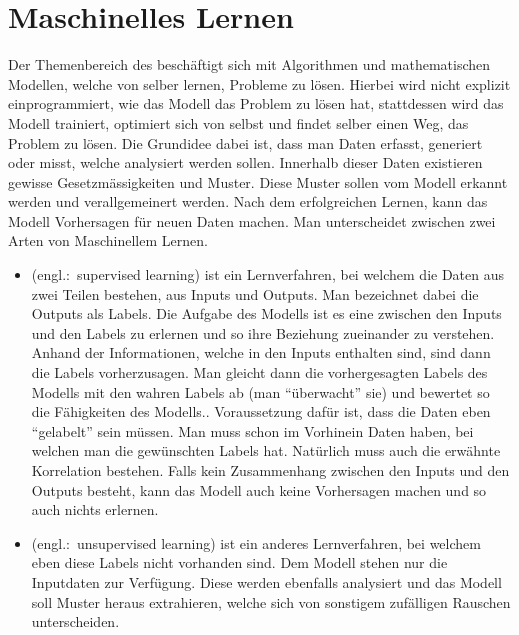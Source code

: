 \chapter{Maschinelles Lernen}

Der Themenbereich des  beschäftigt sich mit Algorithmen und mathematischen Modellen, welche von selber lernen, Probleme zu lösen.
Hierbei wird nicht explizit einprogrammiert, wie das Modell das Problem zu lösen
hat, stattdessen wird das Modell trainiert, optimiert sich von selbst und findet selber
einen Weg, das Problem zu lösen.
Die Grundidee dabei ist, dass man Daten erfasst, generiert oder misst, welche
analysiert werden sollen. Innerhalb dieser Daten existieren gewisse
Gesetzmässigkeiten und Muster. Diese Muster sollen vom Modell
erkannt werden und verallgemeinert werden. Nach dem erfolgreichen Lernen,
kann das Modell Vorhersagen für neuen Daten machen.
\para{}
Man unterscheidet zwischen zwei Arten von Maschinellem Lernen.
\begin{itemize}
\item{
     (engl.:\ supervised learning) ist ein
    Lernverfahren, bei welchem die Daten aus zwei Teilen bestehen, aus Inputs und
    Outputs. Man bezeichnet dabei die Outputs als Labels. Die Aufgabe des Modells
    ist es eine  zwischen den Inputs und den Labels zu
    erlernen und so ihre Beziehung zueinander zu verstehen.
    Anhand der Informationen, welche in den Inputs enthalten
    sind, sind dann die Labels vorherzusagen. Man gleicht dann die
    vorhergesagten Labels des Modells mit den wahren Labels ab (man
    ``überwacht'' sie) und bewertet so die Fähigkeiten des Modells..
    \para{}
    Voraussetzung dafür ist, dass die Daten eben ``gelabelt'' sein müssen.
    Man muss schon im Vorhinein Daten haben, bei welchen man die gewünschten
    Labels hat. Natürlich muss auch die erwähnte Korrelation bestehen. Falls
    kein Zusammenhang zwischen den Inputs und den Outputs besteht, kann das
    Modell auch keine Vorhersagen machen und so auch nichts erlernen.
  }
\item{
     (engl.:\ unsupervised learning) ist ein anderes
    Lernverfahren, bei welchem eben diese Labels nicht vorhanden sind. Dem
    Modell stehen nur die Inputdaten zur Verfügung. Diese werden ebenfalls analysiert
    und das Modell soll Muster heraus extrahieren, welche sich von sonstigem
    zufälligen Rauschen unterscheiden.
  }
\end{itemize}

